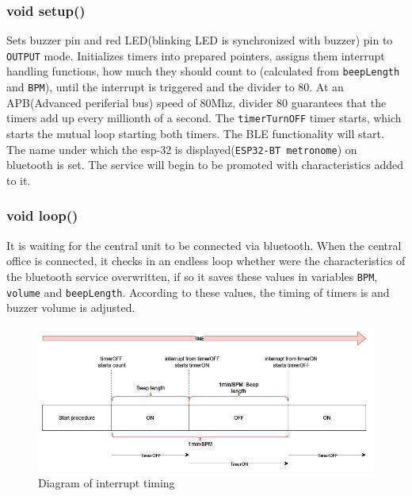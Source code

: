 \documentclass[a4paper, 11pt, twocolumn]{article}
\begin{document}
    \subsubsection{void setup()}
        Sets buzzer pin and red LED(blinking LED is synchronized with buzzer) pin to \texttt{OUTPUT} mode. Initializes timers into prepared pointers,
        assigns them interrupt handling functions, how much they should count to (calculated from \texttt{beepLength} and \texttt{BPM}),
        until the interrupt is triggered and the divider to 80. At an APB(Advanced periferial bus) speed of 80Mhz, divider 80 guarantees that the timers
        add up every millionth of a second. The \texttt{timerTurnOFF} timer starts, which starts the mutual loop
        starting both timers. The BLE functionality will start. The name under which the esp-32 is displayed(\texttt{ESP32-BT metronome}) on bluetooth is set.
        The service will begin to be promoted with characteristics added to it.

    \subsubsection{void loop()}
        It is waiting for the central unit to be connected via bluetooth. When the central office is connected, it checks in an endless loop whether
        were the characteristics of the bluetooth service overwritten, if so it saves these values in variables \texttt{BPM}, \texttt{volume} and 
        \texttt{beepLength}. According to these values, the timing of timers is and buzzer volume is adjusted.
        
    \begin{figure}[ht]
        \centering
        \includegraphics[width=1 \linewidth]{diagram_in_time.jpg}

        \caption{Diagram of interrupt timing}
        \label{fig:timediagram}
    \end{figure}
\end{document}
